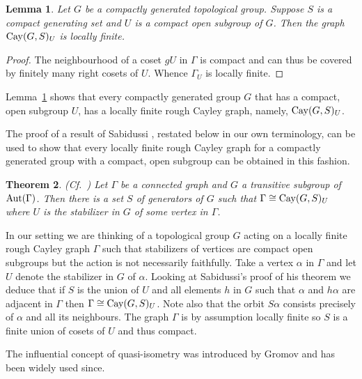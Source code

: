 \documentclass{emsprocart}
\newtheorem{theorem}{Theorem}[section]
\newtheorem{lemma}[theorem]{Lemma}
\theoremstyle{definition}
\begin{document}
\begin{lemma} \label{Llocallyfinite}
Let $G$ be a compactly generated topological group.  Suppose $S$
is a compact generating set and
$U$ is a compact open subgroup of $G$.
Then the graph
${\mbox{${\rm Cay}$}}(G,S)_U$ is locally finite.
\end{lemma}

\noindent
\begin{proof}  The neighbourhood of a coset $gU$ in $\Gamma$ is compact
and can thus be covered by finitely many right cosets of $U$.  Whence
$\Gamma_U$ is locally finite.  \end{proof}

\medskip

Lemma~\ref{Llocallyfinite} shows that every compactly generated group $G$
that has a compact, open subgroup $U$, has a locally finite rough Cayley
graph, namely, ${\mbox{${\rm Cay}$}}(G,S)_U$.

The proof of a result of Sabidussi \cite[Theorem 2]{Sabidussi1964}, restated
below in our own terminology, can be used to show that every locally finite
rough Cayley graph for a compactly generated group with a compact, open
subgroup can be obtained in this fashion.

\begin{theorem}{\rm (Cf.~\cite[Theorem 2]{Sabidussi1964})}
Let $\Gamma$ be a connected graph and $G$ a transitive subgroup of
${\mbox{${\rm Aut}$}}(\Gamma)$.  Then there is a set $S$ of generators of $G$ such
that $\Gamma\cong {\mbox{${\rm Cay}$}}(G, S)_U$ where $U$ is the stabilizer in $G$
of some vertex in $\Gamma$.
\end{theorem}

In our setting we are thinking of a topological group $G$ acting on a
locally finite  rough Cayley graph $\Gamma$ such that stabilizers of vertices are compact open subgroups but the action is  not necessarily
faithfully.  Take a
vertex $\alpha$ in $\Gamma$ and let $U$ denote the stabilizer in $G$
of $\alpha$.  Looking at Sabidussi's proof of his theorem we deduce that if
$S$ is the union of $U$ and all elements $h$ in $G$ such that
$\alpha$ and $h\alpha$ are adjacent in $\Gamma$
then $\Gamma\cong {\mbox{${\rm Cay}$}}(G, S)_U$.
Note also that the orbit $S\alpha$ consists precisely of
$\alpha$ and  all
its neighbours.  The graph $\Gamma$ is by assumption locally finite
so $S$ is a finite
union of cosets of $U$ and thus compact.

The influential concept of
quasi-isometry was introduced by Gromov \cite{Gromov1986} and has been
widely used since.   
\end{document}
